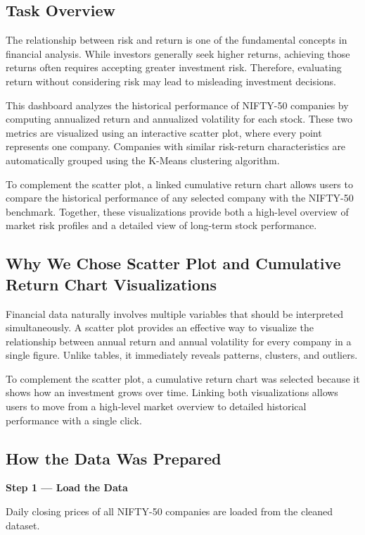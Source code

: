 \documentclass[14pt,a4paper]{extreport}
\begin{document}
\subsection{Task Overview}
The relationship between risk and return is one of the fundamental
concepts in financial analysis. While investors generally seek higher
returns, achieving those returns often requires accepting greater
investment risk. Therefore, evaluating return without considering risk
may lead to misleading investment decisions.

This dashboard analyzes the historical performance of NIFTY-50 companies
by computing annualized return and annualized volatility for each stock.
These two metrics are visualized using an interactive scatter plot, where
every point represents one company. Companies with similar risk-return
characteristics are automatically grouped using the K-Means clustering
algorithm.

To complement the scatter plot, a linked cumulative return chart allows
users to compare the historical performance of any selected company with
the NIFTY-50 benchmark. Together, these visualizations provide both a
high-level overview of market risk profiles and a detailed view of
long-term stock performance.

\subsection{Why We Chose Scatter Plot and Cumulative Return Chart Visualizations}
Financial data naturally involves multiple variables that should be
interpreted simultaneously. A scatter plot provides an effective way to
visualize the relationship between annual return and annual volatility
for every company in a single figure. Unlike tables, it immediately
reveals patterns, clusters, and outliers.

To complement the scatter plot, a cumulative return chart was selected
because it shows how an investment grows over time. Linking both
visualizations allows users to move from a high-level market overview to
detailed historical performance with a single click.

\subsection{How the Data Was Prepared}

\noindent\textbf{Step 1 --- Load the Data}

Daily closing prices of all NIFTY-50 companies are loaded from the
cleaned dataset.
\end{document}
